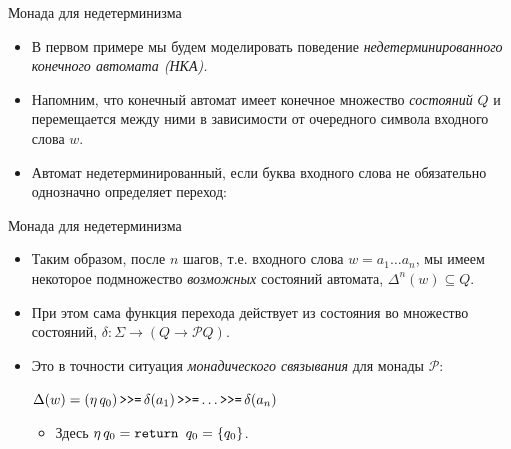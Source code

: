 \documentclass[xcolor=dvipsnames]{beamer}
\newcommand{\bind}{\mathop{\mbox{\tt {>}>=}}}
\newcommand{\Pc}{\mathcal{P}}
\begin{document}
\begin{frame}{Монада для недетерминизма}
 
 \begin{itemize}[<+->]
  \item В первом примере мы будем моделировать поведение {\em недетерминированного конечного автомата (НКА).}
  \item Напомним, что конечный автомат имеет конечное множество {\em состояний} $Q$ и перемещается между ними в зависимости от очередного символа входного слова $w$.
  \item Автомат недетерминированный, если буква входного слова не обязательно однозначно определяет переход:
  
  \begin{center}
  \end{center}
 \end{itemize}

\end{frame}

\begin{frame}{Монада для недетерминизма}
 
 \begin{itemize}[<+->]
  \item Таким образом, после $n$ шагов, т.е. входного слова $w = a_1 \ldots a_n$, мы имеем некоторое подмножество {\em возможных} состояний автомата, $\Delta^n(w) \subseteq Q$.
  \item При этом сама функция перехода действует из состояния во множество состояний, $\delta \colon \Sigma \to (Q \to \Pc Q)$.
  \item Это в точности ситуация {\em монадического связывания} для монады $\Pc$:
  
  \centerline{\(
   \Delta(w) = (\eta\, q_0) \bind \delta(a_1) \bind \ldots \bind \delta(a_n) 
  \)}
  \begin{itemize}
  \item Здесь $\eta\, q_0 = \mbox{\tt return\ } q_0 = \{ q_0 \}$.
  \end{itemize}

  
 \end{itemize}

\end{frame}
\end{document}
